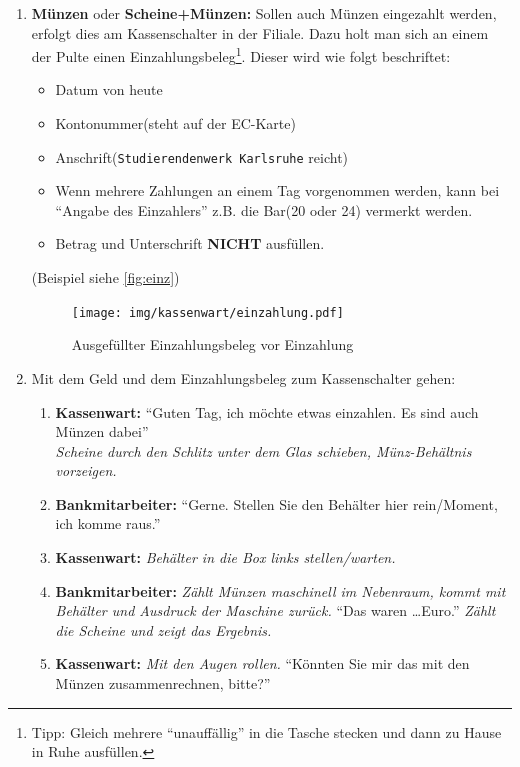 \documentclass[10pt,a4paper,noendnumber=true]{scrartcl}
\begin{document}
\begin{enumerate}
\begin{enumerate}
		\item \textbf{Münzen} oder \textbf{Scheine+Münzen:} Sollen auch Münzen eingezahlt werden, erfolgt dies am Kassenschalter in der Filiale. Dazu holt man sich an einem der Pulte einen Einzahlungsbeleg\footnote{Tipp: Gleich mehrere "`unauffällig"' in die Tasche stecken und dann zu Hause in Ruhe ausfüllen.}. Dieser wird wie folgt beschriftet:
		\begin{itemize}
			\item Datum von heute
			\item Kontonummer(steht auf der EC-Karte)
			\item Anschrift(\texttt{Studierendenwerk Karlsruhe} reicht)
			\item Wenn mehrere Zahlungen an einem Tag vorgenommen werden, kann bei "`Angabe des Einzahlers"' z.B. die Bar(20 oder 24) vermerkt werden.
			\item Betrag und Unterschrift \textbf{NICHT} ausfüllen.
		\end{itemize}
		(Beispiel siehe \autoref{fig:einz})
		\begin{figure}[H]
			\centering\texttt{[image: img/kassenwart/einzahlung.pdf]}
			\caption{Ausgefüllter Einzahlungsbeleg vor Einzahlung}\label{fig:einz}
		\end{figure}
	
		\item Mit dem Geld und dem Einzahlungsbeleg zum Kassenschalter gehen:
		\begin{enumerate}
			\item \textbf{Kassenwart:} "`Guten Tag, ich möchte etwas einzahlen. Es sind auch Münzen dabei"'\\
			\textit{Scheine durch den Schlitz unter dem Glas schieben, Münz-Behältnis vorzeigen.}
			
			\item \textbf{Bankmitarbeiter:} "`Gerne. Stellen Sie den Behälter hier rein/Moment, ich komme raus."'
			
			\item \textbf{Kassenwart:} \textit{Behälter in die Box links stellen/warten.}
			
			\item \textbf{Bankmitarbeiter:} \textit{Zählt Münzen maschinell im Nebenraum, kommt mit Behälter und Ausdruck der Maschine zurück.} "`Das waren \ldots Euro."' \textit{Zählt die Scheine und zeigt das Ergebnis.}
			
			\item \textbf{Kassenwart:} \textit{Mit den Augen rollen.} "`Könnten Sie mir das mit den Münzen zusammenrechnen, bitte?"'
			

\end{enumerate}
\end{enumerate}
\end{enumerate}
\end{document}
